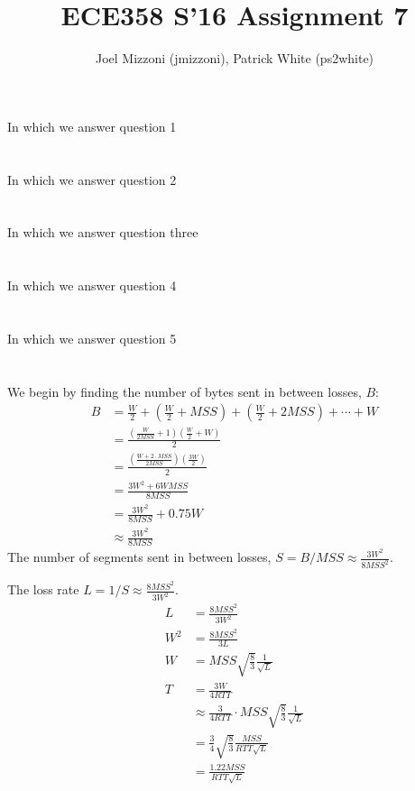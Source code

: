 \documentclass[10pt,a4paper]{article}
\author{Joel Mizzoni (jmizzoni), Patrick White (ps2white)}
\begin{document}
\title{ECE358 S'16 Assignment 7}
\maketitle
\section{}
In which we answer question 1
\section{}
In which we answer question 2
\section{}
In which we answer question three
\section{}
In which we answer question 4
\section{}
In which we answer question 5
\section{}
We begin by finding the number of bytes sent in between losses, $B$:
\begin{align*}
    B&=\frac{W}{2} + \left(\frac{W}{2} + MSS\right) + \left(\frac{W}{2} + 2MSS\right) + \cdots + W \\
     &=\frac{\left(\frac{W}{2MSS}+1\right)\left(\frac{W}{2}+W\right)}{2} \\
     &=\frac{\left(\frac{W+2\cdot MSS}{2MSS}\right)\left(\frac{3W}{2}\right)}{2} \\
     &=\frac{3W^2+6WMSS}{8MSS} \\
     &=\frac{3W^2}{8MSS} + 0.75 W \\
     &\approx \frac{3W^2}{8MSS}
\end{align*}
The number of segments sent in between losses, $S=B/MSS\approx\displaystyle\frac{3W^2}{8MSS^2}$.

The loss rate $L=1/S\approx\displaystyle\frac{8MSS^2}{3W^2}$.
\begin{align*}
    L&=\frac{8MSS^2}{3W^2} \\
    W^2&=\frac{8MSS^2}{3L} \\
    W&=MSS\sqrt{\frac{8}{3}}\frac{1}{\sqrt{L}} \\
    T&=\frac{3W}{4RTT} \\
    &\approx\frac{3}{4RTT}\cdot MSS\sqrt{\frac{8}{3}}\frac{1}{\sqrt{L}} \\
    &=\frac{3}{4}\sqrt{\frac{8}{3}}\frac{MSS}{RTT\sqrt{L}} \\
    &=\frac{1.22MSS}{RTT\sqrt{L}}
\end{align*}
\end{document}
